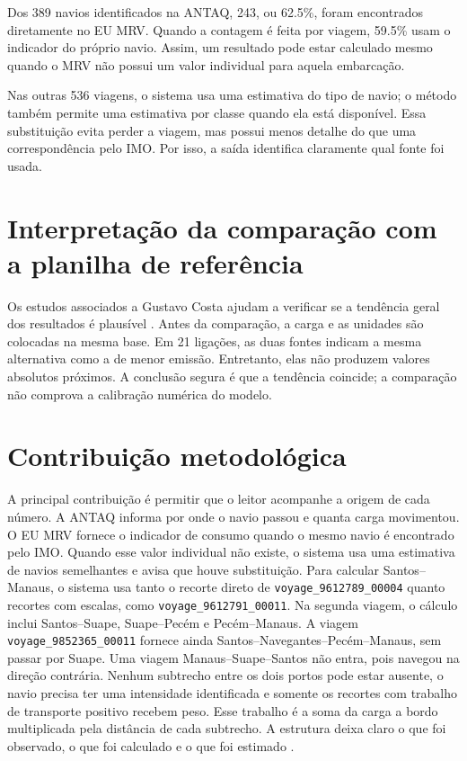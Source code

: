 \documentclass[12pt,a4paper]{report}
\begin{document}
Dos \num{389} navios identificados na ANTAQ, \num{243}, ou \num{62.5}\%, foram encontrados diretamente no EU MRV. Quando a contagem é feita por viagem, \num{59.5}\% usam o indicador do próprio navio. Assim, um resultado pode estar calculado mesmo quando o MRV não possui um valor individual para aquela embarcação.

Nas outras \num{536} viagens, o sistema usa uma estimativa do tipo de navio; o método também permite uma estimativa por classe quando ela está disponível. Essa substituição evita perder a viagem, mas possui menos detalhe do que uma correspondência pelo IMO. Por isso, a saída identifica claramente qual fonte foi usada.

\section{Interpretação da comparação com a planilha de referência}

Os estudos associados a Gustavo Costa ajudam a verificar se a tendência geral dos resultados é plausível \citep{competitiveness2024,decarb2024}. Antes da comparação, a carga e as unidades são colocadas na mesma base. Em 21 ligações, as duas fontes indicam a mesma alternativa como a de menor emissão. Entretanto, elas não produzem valores absolutos próximos. A conclusão segura é que a tendência coincide; a comparação não comprova a calibração numérica do modelo.

\section{Contribuição metodológica}

A principal contribuição é permitir que o leitor acompanhe a origem de cada número. A ANTAQ informa por onde o navio passou e quanta carga movimentou. O EU MRV fornece o indicador de consumo quando o mesmo navio é encontrado pelo IMO. Quando esse valor individual não existe, o sistema usa uma estimativa de navios semelhantes e avisa que houve substituição. Para calcular Santos--Manaus, o sistema usa tanto o recorte direto de \texttt{voyage\_9612789\_00004} quanto recortes com escalas, como \texttt{voyage\_9612791\_00011}. Na segunda viagem, o cálculo inclui Santos--Suape, Suape--Pecém e Pecém--Manaus. A viagem \texttt{voyage\_9852365\_00011} fornece ainda Santos--Navegantes--Pecém--Manaus, sem passar por Suape. Uma viagem Manaus--Suape--Santos não entra, pois navegou na direção contrária. Nenhum subtrecho entre os dois portos pode estar ausente, o navio precisa ter uma intensidade identificada e somente os recortes com trabalho de transporte positivo recebem peso. Esse trabalho é a soma da carga a bordo multiplicada pela distância de cada subtrecho. A estrutura deixa claro o que foi observado, o que foi calculado e o que foi estimado \citep{competitiveness2024,decarb2024}.
\end{document}
